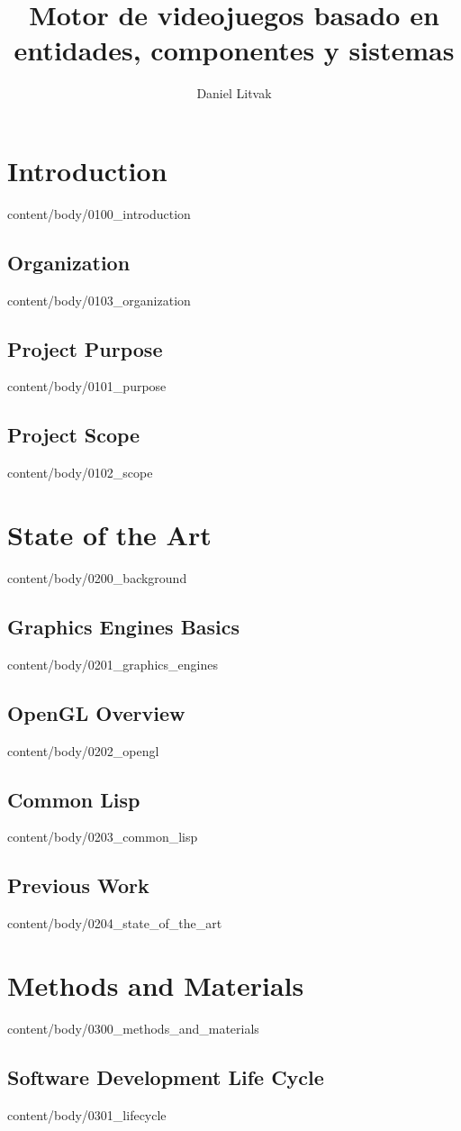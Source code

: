 \documentclass[english, tfg, loc, lof, covers, printable, firstnumbered, epsbased]{tfgtfmthesisuam}
\title{Motor de videojuegos basado en entidades, componentes y sistemas}
\author{Daniel Litvak}
\begin{document}



\chapter{Introduction}{content/body/0100_introduction}
  \section{Organization}{content/body/0103_organization}
  \section{Project Purpose}{content/body/0101_purpose}
  \section{Project Scope}{content/body/0102_scope}

\chapter{State of the Art}{content/body/0200_background}
  \section{Graphics Engines Basics}{content/body/0201_graphics_engines}
  \section{OpenGL Overview}{content/body/0202_opengl}
  \section{Common Lisp}{content/body/0203_common_lisp}
  \section{Previous Work}{content/body/0204_state_of_the_art}

\chapter{Methods and Materials}{content/body/0300_methods_and_materials}
  \section{Software Development Life Cycle}{content/body/0301_lifecycle}
\end{document}
